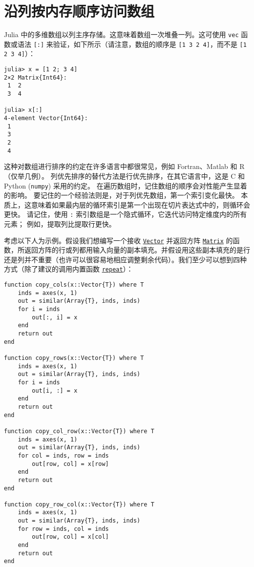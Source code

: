 \hypertarget{16800011477786249644}{}


\section{沿列按内存顺序访问数组}



Julia 中的多维数组以列主序存储。这意味着数组一次堆叠一列。这可使用 \texttt{vec} 函数或语法 \texttt{[:]} 来验证，如下所示（请注意，数组的顺序是 \texttt{[1 3 2 4]}，而不是 \texttt{[1 2 3 4]}）：




\begin{verbatim}
julia> x = [1 2; 3 4]
2×2 Matrix{Int64}:
 1  2
 3  4

julia> x[:]
4-element Vector{Int64}:
 1
 3
 2
 4
\end{verbatim}



这种对数组进行排序的约定在许多语言中都很常见，例如 Fortran、Matlab 和 R（仅举几例）。 列优先排序的替代方法是行优先排序，在其它语言中，这是 C 和 Python (\texttt{numpy}) 采用的约定。 在遍历数组时，记住数组的顺序会对性能产生显着的影响。 要记住的一个经验法则是，对于列优先数组，第一个索引变化最快。 本质上，这意味着如果最内层的循环索引是第一个出现在切片表达式中的，则循环会更快。 请记住，使用 \texttt{:} 索引数组是一个隐式循环，它迭代访问特定维度内的所有元素； 例如，提取列比提取行更快。



考虑以下人为示例。假设我们想编写一个接收 \hyperlink{10571362059486397014}{\texttt{Vector}} 并返回方阵 \hyperlink{5448927444601277512}{\texttt{Matrix}} 的函数，所返回方阵的行或列都用输入向量的副本填充。并假设用这些副本填充的是行还是列并不重要（也许可以很容易地相应调整剩余代码）。我们至少可以想到四种方式（除了建议的调用内置函数 \hyperlink{15426606278434194584}{\texttt{repeat}}）：




\begin{verbatim}
function copy_cols(x::Vector{T}) where T
    inds = axes(x, 1)
    out = similar(Array{T}, inds, inds)
    for i = inds
        out[:, i] = x
    end
    return out
end

function copy_rows(x::Vector{T}) where T
    inds = axes(x, 1)
    out = similar(Array{T}, inds, inds)
    for i = inds
        out[i, :] = x
    end
    return out
end

function copy_col_row(x::Vector{T}) where T
    inds = axes(x, 1)
    out = similar(Array{T}, inds, inds)
    for col = inds, row = inds
        out[row, col] = x[row]
    end
    return out
end

function copy_row_col(x::Vector{T}) where T
    inds = axes(x, 1)
    out = similar(Array{T}, inds, inds)
    for row = inds, col = inds
        out[row, col] = x[col]
    end
    return out
end
\end{verbatim}



